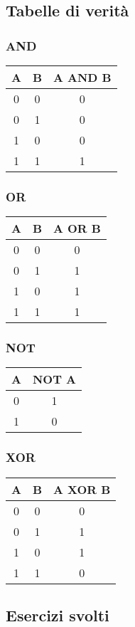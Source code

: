 \documentclass[12pt,a4paper]{article}
\begin{document}
\subsection{Tabelle di verità}

\subsubsection{AND}
\begin{tabular}{c c | c}
A & B & A AND B \\
\hline
0 & 0 & 0 \\
0 & 1 & 0 \\
1 & 0 & 0 \\
1 & 1 & 1 \\
\end{tabular}

\subsubsection{OR}
\begin{tabular}{c c | c}
A & B & A OR B \\
\hline
0 & 0 & 0 \\
0 & 1 & 1 \\
1 & 0 & 1 \\
1 & 1 & 1 \\
\end{tabular}

\subsubsection{NOT}
\begin{tabular}{c | c}
A & NOT A \\
\hline
0 & 1 \\
1 & 0 \\
\end{tabular}

\subsubsection{XOR}
\begin{tabular}{c c | c}
A & B & A XOR B \\
\hline
0 & 0 & 0 \\
0 & 1 & 1 \\
1 & 0 & 1 \\
1 & 1 & 0 \\
\end{tabular}

\subsection{Esercizi svolti}
\end{document}
